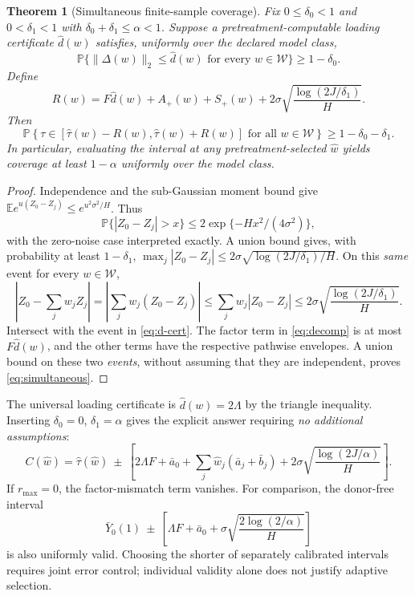 \documentclass[11pt,a4paper]{article}
\newtheorem{theorem}{Theorem}[section]
\newcommand{\E}{\mathbb E}
\newcommand{\Prb}{\mathbb P}
\newcommand{\W}{\mathcal W}
\newcommand{\norm}[1]{\lVert#1\rVert}
\begin{document}
\begin{theorem}[Simultaneous finite-sample coverage]\label{thm:coverage}
Fix $0\le\delta_0<1$ and $0<\delta_1<1$ with $\delta_0+\delta_1\le\alpha<1$. Suppose a pretreatment-computable loading certificate $\widehat d(w)$ satisfies, uniformly over the declared model class,
\begin{equation}\label{eq:d-cert}
 \Prb\bigl\{\norm{\Delta(w)}_2\le\widehat d(w)
            \text{ for every }w\in\W\bigr\}\ge1-\delta_0.
\end{equation}
Define
\begin{equation}\label{eq:rad}
 R(w)=F\widehat d(w)+A_+(w)+S_+(w)
            +2\sigma\sqrt{\frac{\log(2J/\delta_1)}H}.
\end{equation}
Then
\begin{equation}\label{eq:simultaneous}
 \Prb\left\{\tau\in[\widehat\tau(w)-R(w),\widehat\tau(w)+R(w)]
                   \text{ for all }w\in\W\right\}
 \ge1-\delta_0-\delta_1.
\end{equation}
In particular, evaluating the interval at \emph{any} pretreatment-selected $\widehat w$ yields coverage at least $1-\alpha$ uniformly over the model class.
\end{theorem}
\begin{proof}
Independence and the sub-Gaussian moment bound give
$\E e^{u(Z_0-Z_j)}\le e^{u^2\sigma^2/H}$. Thus
\[
 \Prb\{|Z_0-Z_j|>x\}\le2\exp\{-Hx^2/(4\sigma^2)\},
\]
with the zero-noise case interpreted exactly. A union bound gives, with probability at least $1-\delta_1$,
$\max_j|Z_0-Z_j|\le2\sigma\sqrt{\log(2J/\delta_1)/H}$. On this \emph{same} event for every $w\in\W$,
\[
 \left|Z_0-\sum_jw_jZ_j\right|
 =\left|\sum_jw_j(Z_0-Z_j)\right|
 \le\sum_jw_j|Z_0-Z_j|
 \le2\sigma\sqrt{\frac{\log(2J/\delta_1)}H}.
\]
Intersect with the event in \eqref{eq:d-cert}. The factor term in \eqref{eq:decomp} is at most $F\widehat d(w)$, and the other terms have the respective pathwise envelopes. A union bound on these two \emph{events}, without assuming that they are independent, proves \eqref{eq:simultaneous}.
\end{proof}

The universal loading certificate is $\widehat d(w)=2\Lambda$ by the triangle inequality. Inserting $\delta_0=0$, $\delta_1=\alpha$ gives the explicit answer requiring \emph{no additional assumptions}:
\begin{equation}\label{eq:universal}
 \boxed{\quad
 C(\widehat w)=\widehat\tau(\widehat w)\ \pm\
 \left[2\Lambda F+\bar a_0+\sum_j\widehat w_j(\bar a_j+\bar b_j)
 +2\sigma\sqrt{\frac{\log(2J/\alpha)}H}\right].\quad}
\end{equation}
If $r_{\max}=0$, the factor-mismatch term vanishes. For comparison, the donor-free interval
\[
 \bar Y_0(1)\ \pm\ \left[\Lambda F+\bar a_0+
 \sigma\sqrt{\frac{2\log(2/\alpha)}H}\right]
\]
is also uniformly valid. Choosing the shorter of separately calibrated intervals requires joint error control; individual validity alone does not justify adaptive selection.
\end{document}
